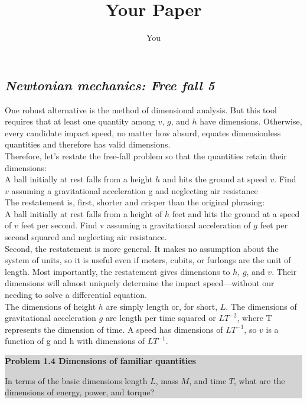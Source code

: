\documentclass[a4paper]{article}
\title{Your Paper}
\author{You}
\numberwithin{equation}{section}
\begin{document}
\pagestyle{empty}
  \rhead{\thepage}
\subsection{\textit{Newtonian mechanics: Free fall \hspace{6 cm} 5}}
{\large One robust alternative is the method of dimensional analysis. But this
tool requires that at least one quantity among $v$, $g$, and $h$ have dimensions.
Otherwise, every candidate impact speed, no matter how absurd, equates
dimensionless quantities and therefore has valid dimensions.
\\

Therefore, let’s restate the free-fall problem so that the quantities retain
  their dimensions:}
\\

{\normalsize A ball initially at rest falls from a height $h$ and hits the ground at speed $v$.
Find $v$ assuming a gravitational acceleration g and neglecting air resistance} 
\\

{\large The restatement is, first, shorter and crisper than the original phrasing:}
\\

{\normalsize A ball initially at rest falls from a height of $h$ feet and hits the ground at a
speed of $v$ feet per second. Find v assuming a gravitational acceleration of $g$
feet per second squared and neglecting air resistance.}
\\

{\large Second, the restatement is more general. It makes no assumption about
the system of units, so it is useful even if meters, cubits, or furlongs are
the unit of length. Most importantly, the restatement gives dimensions to
$h$, $g$, and $v$. Their dimensions will almost uniquely determine the impact
speed—without our needing to solve a differential equation.
\\

The dimensions of height $h$ are simply length or, for short, $L$. The dimensions           
of gravitational acceleration $g$ are length per time squared or $LT^{−2}$,
where T represents the dimension of time. A speed has dimensions of
$LT^{−1}$, so $v$ is a function of g and h with dimensions of $LT^{−1}$.}
\\

\colorbox{lightgray}{
\begin{minipage}{\textwidth}
 {\normalsize\textbf{Problem 1.4 Dimensions of familiar quantities}

In terms of the basic dimensions length $L$, mass $M$, and time $T$, what are the
dimensions of energy, power, and torque?}
\end{minipage}
}
\\
\end{document}
